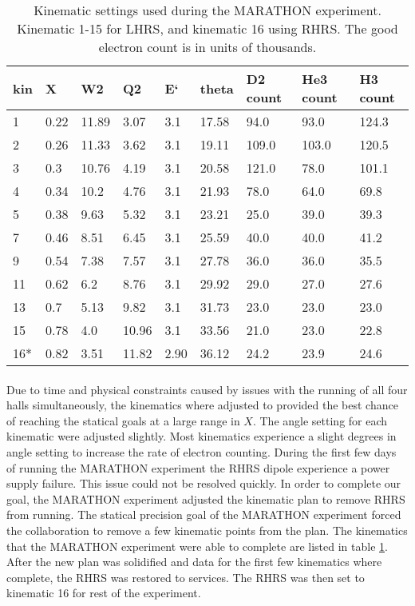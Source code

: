 \begin{table}[]
	\begin{tabular}{|l|l|l|l|l|l|l|l|l|}
		\hline
		kin & X    & W2    & Q2    & E`   & theta & D2 count & He3 count & H3 count \\ \hline
		1   & 0.22 & 11.89 & 3.07  & 3.1  & 17.58 & 94.0     & 93.0      & 124.3    \\ \hline
		2   & 0.26 & 11.33 & 3.62  & 3.1  & 19.11 & 109.0    & 103.0     & 120.5    \\ \hline
		3   & 0.3  & 10.76 & 4.19  & 3.1  & 20.58 & 121.0    & 78.0      & 101.1    \\ \hline
		4   & 0.34 & 10.2  & 4.76  & 3.1  & 21.93 & 78.0     & 64.0      & 69.8     \\ \hline
		5   & 0.38 & 9.63  & 5.32  & 3.1  & 23.21 & 25.0     & 39.0      & 39.3     \\ \hline
		7   & 0.46 & 8.51  & 6.45  & 3.1  & 25.59 & 40.0     & 40.0      & 41.2     \\ \hline
		9   & 0.54 & 7.38  & 7.57  & 3.1  & 27.78 & 36.0     & 36.0      & 35.5     \\ \hline
		11  & 0.62 & 6.2   & 8.76  & 3.1  & 29.92 & 29.0     & 27.0      & 27.6     \\ \hline
		13  & 0.7  & 5.13  & 9.82  & 3.1  & 31.73 & 23.0     & 23.0      & 23.0     \\ \hline
		15  & 0.78 & 4.0   & 10.96 & 3.1  & 33.56 & 21.0     & 23.0      & 22.8     \\ \hline
		16*  & 0.82 & 3.51  & 11.82 & 2.90 & 36.12 &24.2 &23.9& 24.6 \\ \hline

	\end{tabular}
	\caption{Kinematic settings used during the MARATHON experiment. Kinematic 1-15 for LHRS, and kinematic 16 using RHRS. The good electron count is in units of thousands. }
	\label{newkin}
\end{table}

\paragraph{}Due to time and physical constraints caused by issues with the running of all four halls simultaneously, the kinematics where adjusted to provided the best chance of reaching the statical goals at a large range in $X$. The angle setting for each kinematic were adjusted slightly. Most kinematics experience a slight degrees in angle setting to increase the rate of electron counting. During the first few days of running the MARATHON experiment the RHRS dipole experience a power supply failure. This issue could not be resolved quickly. In order to complete our goal, the MARATHON experiment adjusted the kinematic plan to remove RHRS from running. The statical precision goal of the MARATHON experiment forced the collaboration to remove a few kinematic points from the plan. The kinematics that the MARATHON experiment were able to complete are listed in table \ref{newkin}. After the new plan was solidified and data for the first few kinematics where complete, the RHRS was restored to services. The RHRS was then set to kinematic 16 for rest of the experiment.      

